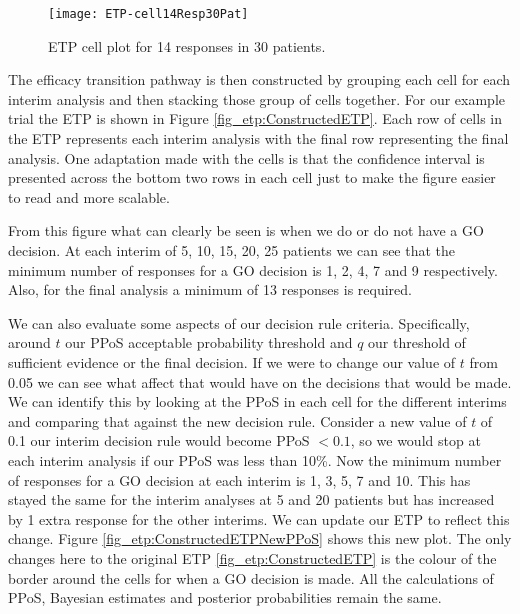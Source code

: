 \begin{figure}[h!]
	\centering
	\caption{ETP cell plot for 14 responses in 30 patients.}
	\label{fig_etp:Cell14Resp30Pat}
	\texttt{[image: ETP-cell14Resp30Pat]}
\end{figure}


The efficacy transition pathway is then constructed by grouping each cell for each interim analysis and then stacking those group of cells together. For our example trial the ETP is shown in Figure \ref{fig_etp:ConstructedETP}. Each row of cells in the ETP represents each interim analysis with the final row representing the final analysis. One adaptation made with the cells is that the confidence interval is presented across the bottom two rows in each cell just to make the figure easier to read and more scalable. 

From this figure what can clearly be seen is when we do or do not have a GO decision. At each interim of 5, 10, 15, 20, 25 patients we can see that the minimum number of responses for a GO decision is 1, 2, 4, 7 and 9 respectively. Also, for the final analysis a minimum of 13 responses is required. 

We can also evaluate some aspects of our decision rule criteria. Specifically, around $t$ our PPoS acceptable probability threshold and $q$ our threshold of sufficient evidence or the final decision. If we were to change our value of $t$ from 0.05 we can see what affect that would have on the decisions that would be made. We can identify this by looking at the PPoS in each cell for the different interims and comparing that against the new decision rule. Consider a new value of $t$ of 0.1 our interim decision rule would become PPoS $< 0.1$, so we would stop at each interim analysis if our PPoS was less than 10\%. Now the minimum number of responses for a GO decision at each interim is 1, 3, 5, 7 and 10. This has stayed the same for the interim analyses at 5 and 20 patients but has increased by 1 extra response for the other interims. We can update our ETP to reflect this change. Figure \ref{fig_etp:ConstructedETPNewPPoS} shows this new plot. The only changes here to the original ETP \ref{fig_etp:ConstructedETP} is the colour of the border around the cells for when a GO decision is made. All the calculations of PPoS, Bayesian estimates and posterior probabilities remain the same. 

